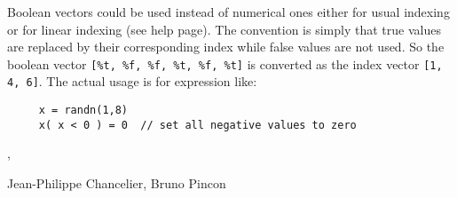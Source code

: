 
Boolean vectors could be used instead of numerical ones either for usual 
indexing or for linear indexing (see  help page). 
The convention is simply that true values are replaced by their corresponding index while 
false values are not used. So the boolean vector \verb+[%t, %f, %f, %t, %f, %t]+ is 
converted as the index vector \verb+[1, 4, 6]+. The actual usage is for expression like:
\begin{Verbatim}
     x = randn(1,8)
     x( x < 0 ) = 0  // set all negative values to zero
\end{Verbatim}
 

\begin{manseealso}
, 
\end{manseealso}

\begin{authors}
   Jean-Philippe Chancelier, Bruno Pincon
\end{authors}
